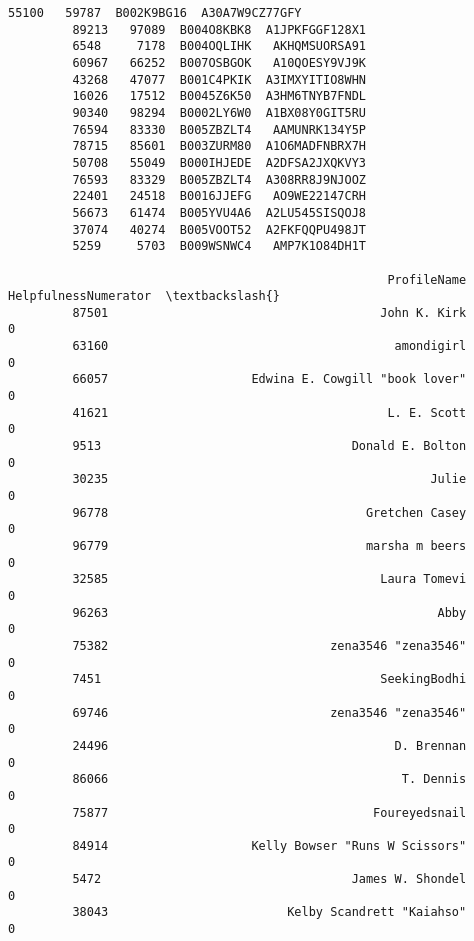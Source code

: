 \documentclass[11pt]{article}
\begin{document}
\begin{Verbatim}[commandchars=\\\{\}]
         55100   59787  B002K9BG16  A30A7W9CZ77GFY   
         89213   97089  B004O8KBK8  A1JPKFGGF128X1   
         6548     7178  B004OQLIHK   AKHQMSUORSA91   
         60967   66252  B007OSBGOK   A10QOESY9VJ9K   
         43268   47077  B001C4PKIK  A3IMXYITIO8WHN   
         16026   17512  B0045Z6K50  A3HM6TNYB7FNDL   
         90340   98294  B0002LY6W0  A1BX08Y0GIT5RU   
         76594   83330  B005ZBZLT4   AAMUNRK134Y5P   
         78715   85601  B003ZURM80  A1O6MADFNBRX7H   
         50708   55049  B000IHJEDE  A2DFSA2JXQKVY3   
         76593   83329  B005ZBZLT4  A308RR8J9NJOOZ   
         22401   24518  B0016JJEFG   AO9WE22147CRH   
         56673   61474  B005YVU4A6  A2LU545SISQOJ8   
         37074   40274  B005VOOT52  A2FKFQQPU498JT   
         5259     5703  B009WSNWC4   AMP7K1O84DH1T   
         
                                                     ProfileName  HelpfulnessNumerator  \textbackslash{}
         87501                                      John K. Kirk                     0   
         63160                                        amondigirl                     0   
         66057                    Edwina E. Cowgill "book lover"                     0   
         41621                                       L. E. Scott                     0   
         9513                                   Donald E. Bolton                     0   
         30235                                             Julie                     0   
         96778                                    Gretchen Casey                     0   
         96779                                    marsha m beers                     0   
         32585                                      Laura Tomevi                     0   
         96263                                              Abby                     0   
         75382                               zena3546 "zena3546"                     0   
         7451                                       SeekingBodhi                     0   
         69746                               zena3546 "zena3546"                     0   
         24496                                        D. Brennan                     0   
         86066                                         T. Dennis                     0   
         75877                                     Foureyedsnail                     0   
         84914                    Kelly Bowser "Runs W Scissors"                     0   
         5472                                   James W. Shondel                     0   
         38043                         Kelby Scandrett "Kaiahso"                     0   

\end{Verbatim}
\end{document}
